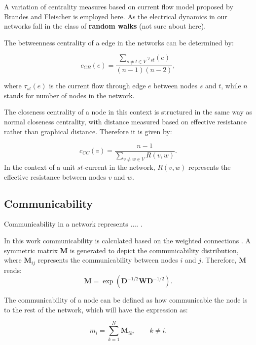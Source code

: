 \documentclass[fleqn,10pt,  amsmath,amssymb,aps]{wlscirep}
\begin{document}
A variation of centrality measures based on current flow model proposed by Brandes and Fleischer \cite{Brandes2005} is employed here. As the electrical dynamics in our networks fall in the class of \textbf{random walks} (not sure about here).

The betweenness centrality of a edge in the networks can be determined by:

\begin{equation}
c_{CB}(e) = \frac{\sum \limits_{s \neq t \in V}\tau_{st}(e)}{(n-1)(n-2)},
\label{eq:ebc}
\end{equation}



where $\tau_{st}(e)$ is the current flow through edge $e$ between nodes $s$ and $t$, while $n$ stands for number of nodes in the network.

The closeness centrality of a node in this context is structured in the same way as normal closeness centrality, with distance measured based on effective resistance rather than graphical distance. Therefore it is given by:

\begin{equation}
	c_{CC}(v) = \frac{n-1}{\sum \limits_{v \neq w \in V} R(v,w)}.
	\label{eq:ecc}
\end{equation}
In the context of a unit $st$-current in the network, $R(v,w)$ represents the effective resistance between nodes $v$ and $w$.

\subsection*{Communicability}
Communicability in a network represents .... \cite{Estrada2008}. 

In this work communicability is calculated based on the weighted connections \cite{Crofts2009}. A symmetric matrix $\mathbf M$ is generated to depict the communicability distribution, where $\mathbf M_{ij}$ represents the communicability between nodes $i$ and $j$. Therefore, $\mathbf M$ reads:
\begin{equation}
\mathbf M = \exp{(\mathbf D^{-1/2} \mathbf W \mathbf D^{-1/2})}.
\end{equation} 

The communicability of a node can be defined as how communicable the node is to the rest of the network, which will have the expression as:

\begin{equation}
	m_i = \sum \limits_{k = 1}^N \mathbf M_{ik}, \qquad k \neq i.
	\label{eq:ncomm}
\end{equation}
\end{document}
